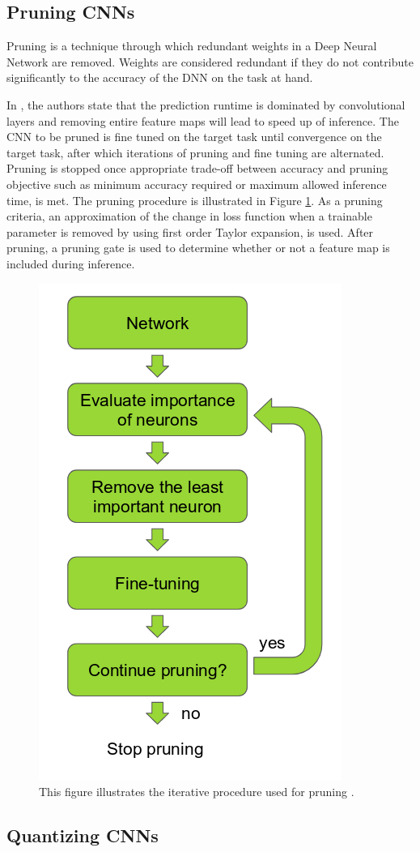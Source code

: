 \subsection{Pruning CNNs}

Pruning is a technique through which redundant weights in a Deep Neural Network are removed. Weights are considered redundant if they do not contribute significantly to the accuracy of the DNN on the task at hand. 

In \cite{DBLP:journals/corr/MolchanovTKAK16}, the authors state that the prediction runtime is dominated by convolutional layers and removing entire feature maps will lead to speed up of inference. The CNN to be pruned is fine tuned on the target task until convergence on the target task, after which iterations of pruning and fine tuning are alternated. Pruning is stopped once appropriate trade-off between accuracy and pruning objective such as minimum accuracy required or maximum allowed inference time, is met. The pruning procedure is illustrated in Figure \ref{Fig:prune}. As a pruning criteria, an approximation of the change in loss function when a trainable parameter is removed by using first order Taylor expansion, is used. After pruning, a pruning gate is used to determine whether or not a feature map is included during inference.

	\begin{figure}[h]
		\centering
		\includegraphics[width=.3\linewidth]{images/pruning_rei}
		\caption{This figure illustrates the iterative procedure used for pruning \cite{DBLP:journals/corr/MolchanovTKAK16}.}
		\label{Fig:prune}
	\end{figure}

\subsection{Quantizing CNNs}

